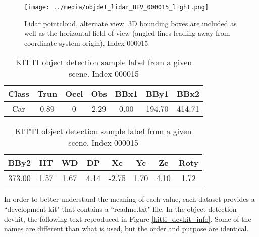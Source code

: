 \begin{figure}[H]
    \texttt{[image: ../media/objdet\_lidar\_BEV\_000015\_light.png]}
    \caption{Lidar pointcloud, alternate view. 3D bounding boxes are included as well as the horizontal field of view (angled lines leading away from coordinate system origin). Index 000015}
    \label{objdet_lidar_sample}
\end{figure}

\def \DEG{$^{\circ}$} %






\begin{table}[H]
	\centering
	\caption{KITTI object detection sample label from a given scene. Index 000015}
	\footnotesize
\begin{tabular}{|c|c|c|c|c|c|c|}
	\hline
	Class & Trun & Occl & Obs  & BBx1  & BBy1   & BBx2  \\
	\hline
	Car   & 0.89       & 0         & 2.29 & 0.00  & 194.70 & 414.71 \\
	\hline
\end{tabular}
\begin{tabular}{|c|c|c|c|c|c|c|c|}
	\hline
	BBy2   & HT   & WD   & DP   & Xc    & Yc   & Zc   & Roty \\
	\hline
	373.00 & 1.57 & 1.67 & 4.14 & -2.75 & 1.70 & 4.10 & 1.72 \\
	\hline
\end{tabular}
\label{kitti_label_sample}
\end{table}

In order to better understand the meaning of each value, each dataset provides a ``development kit" that contains a ``readme.txt" file. In the object detection devkit, the following text reproduced in Figure \ref{kitti_devkit_info}. Some of the names are different than what is used, but the order and purpose are identical.

